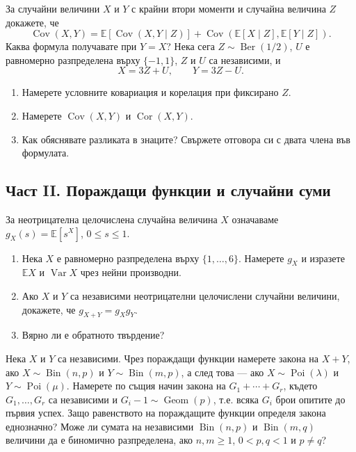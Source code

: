 \documentclass[11pt,a4paper]{article}
\newenvironment{enumeratea}{\begin{enumerate}[label=(\alph*),itemsep=0.28em,topsep=0.25em]}{\end{enumerate}}
\newcommand{\Ebb}{\mathbb E}
\newcommand{\Var}{\operatorname{Var}}
\newcommand{\Cov}{\operatorname{Cov}}
\newcommand{\Cor}{\operatorname{Cor}}
\newcommand{\Ber}{\operatorname{Ber}}
\newcommand{\Bin}{\operatorname{Bin}}
\newcommand{\Poi}{\operatorname{Poi}}
\newcommand{\Geom}{\operatorname{Geom}}
\newcounter{problem}[section]
\begin{document}
\begin{problemstar}
За случайни величини $X$ и $Y$ с крайни втори моменти и случайна величина $Z$
докажете, че
\[
\Cov(X,Y)=\Ebb\!\left[\Cov(X,Y\mid Z)\right]
+\Cov\!\left(\Ebb[X\mid Z],\Ebb[Y\mid Z]\right).
\]
Каква формула получавате при $Y=X$?
Нека сега $Z\sim\Ber(1/2)$, $U$ е равномерно разпределена върху $\{-1,1\}$,
$Z$ и $U$ са независими, и
\[
X=3Z+U,\qquad Y=3Z-U.
\]
\begin{enumeratea}
  \item Намерете условните ковариация и корелация при фиксирано $Z$.
  \item Намерете $\Cov(X,Y)$ и $\Cor(X,Y)$.
  \item Как обяснявате разликата в знаците? Свържете отговора си с двата
  члена във формулата.
\end{enumeratea}
\end{problemstar}

\subsection*{Част II. Пораждащи функции и случайни суми}

\begin{problempencil}[К1, КН 2024]
За неотрицателна целочислена случайна величина $X$ означаваме
$g_X(s)=\Ebb[s^X]$, $0\le s\le1$.
\begin{enumeratea}
  \item Нека $X$ е равномерно разпределена върху $\{1,\ldots,6\}$.
  Намерете $g_X$ и изразете $\Ebb X$ и $\Var X$ чрез нейни производни.
  \item Ако $X$ и $Y$ са независими неотрицателни целочислени случайни
  величини, докажете, че $g_{X+Y}=g_Xg_Y$.
  \item[$(\mathrm{c})^\star$] Вярно ли е обратното твърдение?
\end{enumeratea}
\end{problempencil}

\begin{problembook}
Нека $X$ и $Y$ са независими. Чрез пораждащи функции намерете закона на $X+Y$,
ако $X\sim\Bin(n,p)$ и $Y\sim\Bin(m,p)$, а след това --- ако
$X\sim\Poi(\lambda)$ и $Y\sim\Poi(\mu)$.
Намерете по същия начин закона на $G_1+\cdots+G_r$, където
$G_1,\ldots,G_r$ са независими и $G_i-1\sim\Geom(p)$, т.е. всяка $G_i$
брои опитите до първия успех.
Защо равенството на пораждащите функции определя закона еднозначно?
Може ли сумата на независими $\Bin(n,p)$ и $\Bin(m,q)$ величини да е
биномично разпределена, ако $n,m\ge1$, $0<p,q<1$ и $p\ne q$?
\end{problembook}
\end{document}
